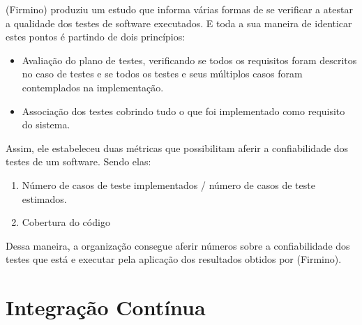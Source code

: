 (Firmino) produziu um estudo que informa várias formas de se verificar a atestar
a qualidade dos testes de software executados. E toda a sua maneira de identicar
estes pontos é partindo de dois princípios:

\begin{itemize}
\item Avaliação do plano de testes, verificando se todos os requisitos foram
descritos no caso de testes e se todos os testes e seus múltiplos casos foram
contemplados na implementação.
\item Associação dos testes cobrindo tudo o que foi implementado como requisito
do sistema.
\end{itemize}

Assim, ele estabeleceu duas métricas que possibilitam aferir a confiabilidade
dos testes de um software. Sendo elas:

\begin{enumerate}
\item Número de casos de teste implementados / número de casos de teste estimados.
\item Cobertura do código
\end{enumerate}

Dessa maneira, a organização consegue aferir números sobre a confiabilidade
dos testes que está e executar pela aplicação dos resultados obtidos por (Firmino).
\section{Integração Contínua}

